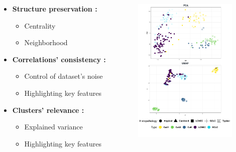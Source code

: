 \documentclass[compress]{beamer}
\begin{document}
\begin{frame}
\begin{overprint}
\begin{columns}[c]
  \begin{column}{0.55\linewidth}
 \begin{itemize}
     \item \textbf{Structure preservation : }\\
     \begin{itemize}
         \item Centrality 
         \item Neighborhood
     \end{itemize}
 \end{itemize}
  \begin{itemize}
    \item   \textbf{Correlations' consistency : }\\
     \begin{itemize}
         \item Control of dataset's noise
         \item Highlighting key features 
     \end{itemize}
\end{itemize}
 \begin{itemize}
    \item   \textbf{Clusters' relevance : }\\
     \begin{itemize}
         \item Explained variance
         \item Highlighting key features 
     \end{itemize}
\end{itemize}

  \end{column}
  \begin{column}{0.45\linewidth}
\begin{figure}
\centering
\includegraphics[height=7cm]{figures/methods/PCA_UMAP2.pdf}
  \end{figure}
  \end{column}
 \end{columns} 
  
\end{overprint}

  \begin{flushright}
\color{IARCdblue}{ \scriptsize{\insertframenumber / \inserttotalframenumber}} \hspace*{2mm}
  \end{flushright}

\end{frame}
\end{document}
